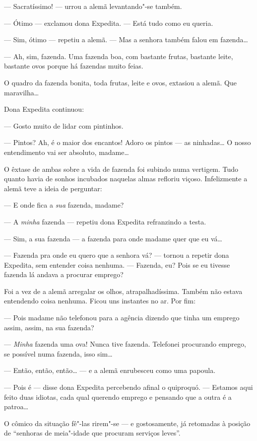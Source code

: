 --- Sacratíssimo! --- urrou a alemã levantando"-se também.

--- Ótimo --- exclamou dona Expedita. --- Está tudo como eu queria.

--- Sim, ótimo --- repetiu a alemã. --- Mas a senhora também falou em
fazenda\ldots{}

--- Ah, sim, fazenda. Uma fazenda boa, com bastante frutas, bastante
leite, bastante ovos porque há fazendas muito feias.

O quadro da fazenda bonita, toda frutas, leite e ovos, extasiou a alemã.
Que maravilha\ldots{}

Dona Expedita continuou:

--- Gosto muito de lidar com pintinhos.

--- Pintos? Ah, é o maior dos encantos! Adoro os pintos --- as
ninhadas\ldots{} O nosso entendimento vai ser absoluto, madame\ldots{}

O êxtase de ambas sobre a vida de fazenda foi subindo numa vertigem.
Tudo quanto havia de sonhos incubados naquelas almas refloriu viçoso.
Infelizmente a alemã teve a ideia de perguntar:

--- E onde fica a \emph{sua} fazenda, madame?

--- A \emph{minha} fazenda --- repetiu dona Expedita refranzindo a
testa.

--- Sim, a sua fazenda --- a fazenda para onde madame quer que eu vá\ldots{}

--- Fazenda pra onde eu quero que a senhora vá? --- tornou a repetir
dona Expedita, sem entender coisa nenhuma. --- Fazenda, eu? Pois se eu
tivesse fazenda lá andava a procurar emprego?

Foi a vez de a alemã arregalar os olhos, atrapalhadíssima. Também não
estava entendendo coisa nenhuma. Ficou uns instantes no ar. Por fim:

--- Pois madame não telefonou para a agência dizendo que tinha um
emprego assim, assim, na sua fazenda?

--- \emph{Minha} fazenda uma ova! Nunca tive fazenda. Telefonei
procurando emprego, se possível numa fazenda, isso sim\ldots{}

--- Então, então, então\ldots{} --- e a alemã enrubesceu como uma papoula.

--- Pois é --- disse dona Expedita percebendo afinal o quiproquó. ---
Estamos aqui feito duas idiotas, cada qual querendo emprego e pensando
que a outra é a patroa\ldots{}

O cômico da situação fê"-las rirem"-se --- e gostosamente, já retomadas à
posição de ``senhoras de meia"-idade que procuram serviços leves''.


